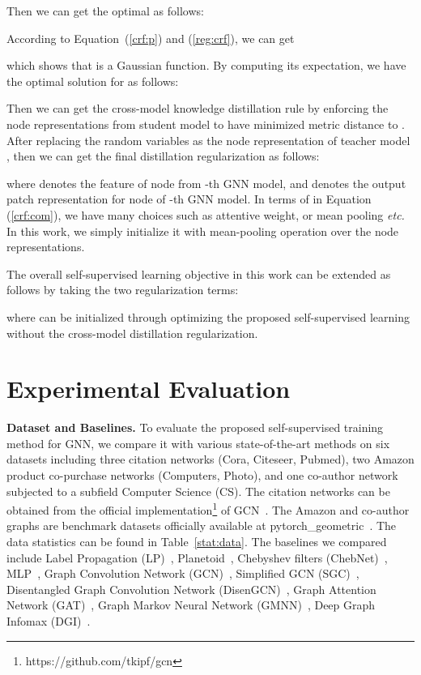 \documentclass[preprint]{article}
\begin{document}
Then we can get the optimal  as follows:

According to Equation~(\ref{crf:p}) and (\ref{reg:crf}), we can get 

which shows that  is a Gaussian function. By computing its expectation, we have the optimal solution for  as follows:

Then we can get the cross-model knowledge distillation rule by enforcing the node representations from student model to have minimized metric distance to . After replacing the random variables  as the node representation  of teacher model , then we can get the final distillation regularization as follows:

where  denotes the   feature of node  from -th GNN model, and  denotes the output patch representation for node  of -th GNN model. In terms of  in Equation (\ref{crf:com}), we have many choices  such as attentive weight, or mean pooling \emph{etc.} In this work, we simply initialize it with mean-pooling operation over the node representations. 

The overall self-supervised learning objective in this work can be extended as follows by taking the two regularization terms:

where  can be initialized through optimizing the proposed self-supervised learning without the cross-model distillation regularization.
 

 

\section{Experimental Evaluation}
\textbf{Dataset and Baselines.} To evaluate the proposed self-supervised training method for GNN, we compare it with various state-of-the-art methods on six datasets including three citation networks (Cora, Citeseer, Pubmed), two Amazon product co-purchase networks (Computers, Photo), and one co-author network subjected to a subfield Computer Science (CS). The citation networks can be obtained from the official implementation\footnote{https://github.com/tkipf/gcn} of GCN~\cite{kipf2016semi}. The Amazon and co-author graphs are benchmark datasets officially available at pytorch\_geometric~\cite{fey2019fast}. The data statistics can be found in Table~\ref{stat:data}.
The baselines we compared  include Label Propagation (LP)~\cite{zhu2003semi}, Planetoid~\cite{yang2016revisiting}, Chebyshev filters (ChebNet)~\cite{defferrard2016convolutional}, MLP~\cite{kipf2016semi}, Graph Convolution Network (GCN)~\cite{kipf2016semi}, Simplified GCN (SGC)~\cite{wu2019simplifying}, Disentangled Graph Convolution Network (DisenGCN)~\cite{ma2019disentangled}, Graph Attention Network (GAT)~\cite{velivckovic2017graph}, Graph Markov Neural Network (GMNN)~\cite{qu2019gmnn}, Deep Graph Infomax (DGI)~\cite{velivckovic2018deep}.
\end{document}
